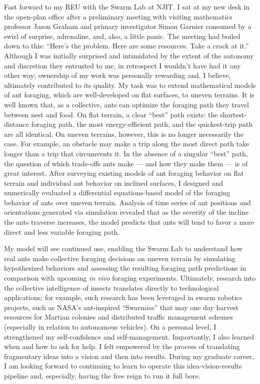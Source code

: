 Fast forward to my REU with the Swarm Lab at NJIT.
I sat at my new desk in the open-plan office after a preliminary meeting with visiting mathematics professor Jason Graham and primary investigator Simon Garnier consumed by a swirl of surprise, adrenaline, and, also, a little panic.
The meeting had boiled down to this:
``Here's the problem.
Here are some resources.
Take a crack at it.''
Although I was initially surprised and intimidated by the extent of the autonomy and discretion they entrusted to me, in retrospect I wouldn't have had it any other way;
ownership of my work was personally rewarding and, I believe, ultimately contributed to its quality.
My task was to extend mathematical models of ant foraging, which are well-developed on flat surfaces, to uneven terrains.
It is well known that, as a collective, ants can optimize the foraging path they travel between nest and food.
On flat terrain, a clear ``best'' path exists: the shortest-distance foraging path, the most energy-efficient path, and the quickest-trip path are all identical.
On uneven terrains, however, this is no longer necessarily the case.
For example, an obstacle may make a trip along the most direct path take longer than a trip that circumvents it.
In the absence of a singular ``best'' path, the question of which trade-offs ants make --- and how they make them --- is of great interest.
After surveying existing models of ant foraging behavior on flat terrain and individual ant behavior on inclined surfaces, I designed and numerically evaluated a differential equations-based model of the foraging behavior of ants over uneven terrain.
Analysis of time series of ant positions and orientations generated via simulation revealed that as the severity of the incline the ants traverse increases, the model predicts that ants will tend to favor a more direct and less variable foraging path.

My model will see continued use, enabling the Swarm Lab to understand how real ants make collective foraging decisions on uneven terrain by simulating hypothesized behaviors and assessing the resulting foraging path predictions in comparison with upcoming \textit{in vivo} foraging experiments.
Ultimately, research into the collective intelligence of insects translates directly to technological applications;
for example, such research has been leveraged in swarm robotics projects, such as NASA's ant-inspired ``Swarmies'' that may one day harvest resources for Martian colonies and distributed traffic management schemes (especially in relation to autonomous vehicles).
On a personal level, I strengthened my self-confidence and self-management.
Importantly, I also learned when and how to ask for help.
I felt empowered by the process of translating fragmentary ideas into a vision and then into results.
During my graduate career, I am looking forward to continuing to learn to operate this idea-vision-results pipeline and, especially, having the free reign to run it full bore.
